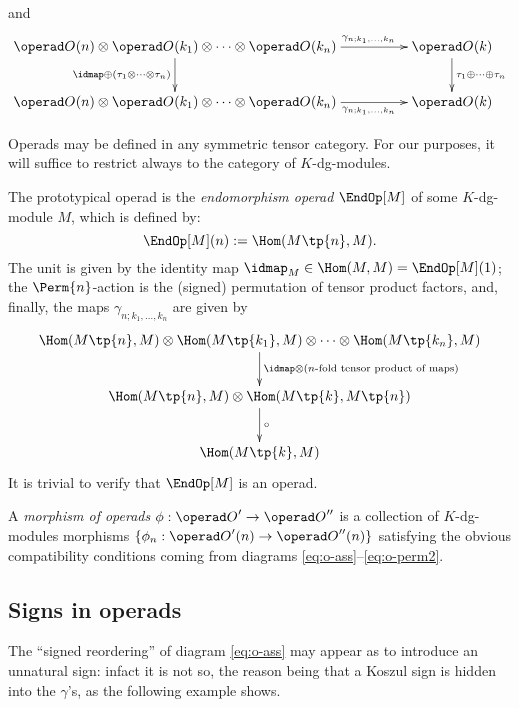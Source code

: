 \begin{definition}
\begin{enumerate}
    and
    \begin{equation}
      {\xymatrix@C=48pt{%
          {\Oo}(n) \otimes {\Oo}(k_1) \otimes \cdots \otimes {\Oo}(k_n)
          & 
          {\Oo}(k)
          \\
          {\Oo}(n) \otimes {\Oo}(k_1) \otimes \cdots \otimes {\Oo}(k_n)
          &
          {\Oo}(k)
          \ar "1,1";"1,2" ^(.70){\gamma_{n; k_1, \ldots, k_n}}
          \ar "2,1";"2,2" _(.70){\gamma_{n; k_1, \ldots, k_n}}
          \ar "1,1";"2,1" _{\idmap \oplus (\tau_1 \otimes \cdots \otimes \tau_n)}
          \ar "1,2";"2,2" ^{\tau_1 \oplus \cdots \oplus \tau_n}
          }}
      \label{eq:o-perm2}
    \end{equation}
  \end{enumerate}
\end{definition}
Operads may be defined in any symmetric tensor category. For our
purposes, it will suffice to restrict always to the category of
$K$-dg-modules.

The prototypical operad is the \emph{endomorphism operad} $\EndOp[M]$ of some
$K$-dg-module $M$, which is defined by:
\begin{equation*}
  \EndOp[M](n) := \Hom( M\tp{n}, M).
\end{equation*}
The unit is given by the identity map $\idmap_M \in \Hom(M,M) =
\EndOp[M](1)$; the $\Perm{n}$-action is the (signed) permutation of
tensor product factors, and, finally, the maps $\gamma_{n; k_1, \ldots, k_n}$
are given by 
\begin{equation*}
  {\xymatrix{%
      \Hom(M\tp{n}, M) \otimes \Hom(M\tp{k_1}, M) \otimes \cdots \otimes \Hom(M\tp{k_n},
      M)
      \\
      \Hom(M\tp{n}, M) \otimes \Hom(M\tp{k}, M\tp{n})
      \\
      \Hom(M\tp{k}, M)
      \ar "1,1";"2,1" ^{\idmap \otimes (\text{$n$-fold tensor product of
          maps})}
      \ar "2,1";"3,1" ^{\circ}
      }}
\end{equation*}
It is trivial to verify that $\EndOp[M]$ is an operad.

A \emph{morphism of operads} $\phi: {\Oo}' \to {\Oo}''$ is a collection of
$K$-dg-modules morphisms $\{\phi_n: {\Oo}'(n) \to {\Oo}''(n)\}$ satisfying the
obvious compatibility conditions coming from diagrams
\eqref{eq:o-ass}--\eqref{eq:o-perm2}. 

\subsection{Signs in operads}
\label{sec:signs-operads}
The ``signed reordering'' of diagram \eqref{eq:o-ass} may appear as to
introduce an unnatural sign: infact it is not so, the reason being
that a Koszul sign is hidden into the $\gamma$'s, as the following example
shows.

